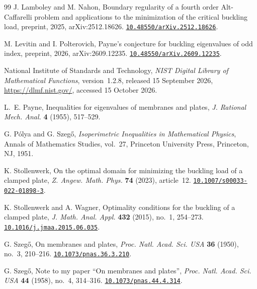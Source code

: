 \documentclass[11pt]{article}
\theoremstyle{remark}
\newcommand{\doi}[1]{\href{https://doi.org/#1}{\nolinkurl{#1}}}
\begin{document}
\begin{thebibliography}{99}
J. Lamboley and M. Nahon,
Boundary regularity of a fourth order Alt-Caffarelli problem and
applications to the minimization of the critical buckling load,
preprint, 2025, arXiv:2512.18626.
\doi{10.48550/arXiv.2512.18626}.

M. Levitin and I. Polterovich,
Payne's conjecture for buckling eigenvalues of odd index,
preprint, 2026, arXiv:2609.12235.
\doi{10.48550/arXiv.2609.12235}.

National Institute of Standards and Technology,
\emph{NIST Digital Library of Mathematical Functions},
version~1.2.8, released 15 September 2026,
\url{https://dlmf.nist.gov/}, accessed 15 October 2026.

L.~E. Payne,
Inequalities for eigenvalues of membranes and plates,
\emph{J. Rational Mech. Anal.} \textbf{4} (1955), 517--529.

G. P\'olya and G. Szeg\H{o},
\emph{Isoperimetric Inequalities in Mathematical Physics},
Annals of Mathematics Studies, vol.~27,
Princeton University Press, Princeton, NJ, 1951.

K. Stollenwerk,
On the optimal domain for minimizing the buckling load of a clamped plate,
\emph{Z. Angew. Math. Phys.} \textbf{74} (2023), article~12.
\doi{10.1007/s00033-022-01898-3}.

K. Stollenwerk and A. Wagner,
Optimality conditions for the buckling of a clamped plate,
\emph{J. Math. Anal. Appl.} \textbf{432} (2015), no.~1, 254--273.
\doi{10.1016/j.jmaa.2015.06.035}.

G. Szeg\H{o},
On membranes and plates,
\emph{Proc. Natl. Acad. Sci. USA} \textbf{36} (1950), no.~3, 210--216.
\doi{10.1073/pnas.36.3.210}.

G. Szeg\H{o},
Note to my paper ``On membranes and plates'',
\emph{Proc. Natl. Acad. Sci. USA} \textbf{44} (1958), no.~4, 314--316.
\doi{10.1073/pnas.44.4.314}.

\end{thebibliography}
\end{document}

